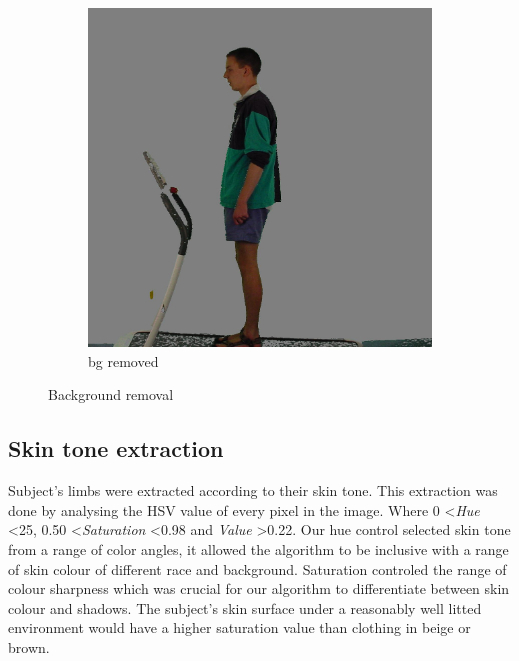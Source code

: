 \documentclass[10pt,journal,compsoc]{IEEEtran}
\begin{document}
\begin{figure}[!htb]
\begin{subfigure}[h]{0.3\linewidth}
\includegraphics[width=\linewidth]{noGreen}
    \caption{bg removed}
\end{subfigure}%
\caption{Background removal}
\end{figure}


\subsection{Skin tone extraction}
Subject's limbs were extracted according to their skin tone. This extraction was done by analysing the HSV value of every pixel in the image. Where 0 \textless\textit{Hue} \textless25, 0.50 \textless\textit{Saturation} \textless0.98 and \textit{Value} \textgreater0.22. Our hue control selected skin tone from a range of color angles, it allowed the algorithm to be inclusive with a range of skin colour of different race and background. Saturation controled the range of colour sharpness which was crucial for our algorithm to differentiate between skin colour and shadows. The subject's skin surface under a reasonably well litted environment would have a higher saturation value than clothing in beige or brown.
\end{document}

